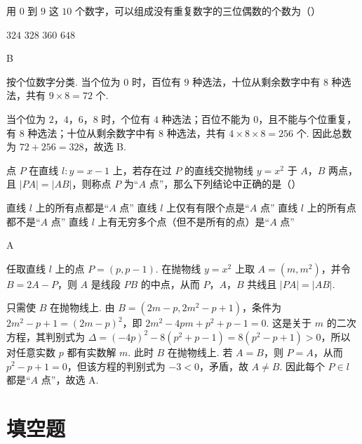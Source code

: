 \begin{problem}
用 \(0\) 到 \(9\) 这 \(10\) 个数字，可以组成没有重复数字的三位偶数的个数为（\quad）

\choices
    {\(324\)}
    {\(328\)}
    {\(360\)}
    {\(648\)}

\begin{answer}
B
\end{answer}

\begin{solution}
按个位数字分类. 当个位为 \(0\) 时，百位有 \(9\) 种选法，十位从剩余数字中有 \(8\) 种选法，共有 \(9\times8=72\) 个.

当个位为 \(2\)，\(4\)，\(6\)，\(8\) 时，个位有 \(4\) 种选法；百位不能为 \(0\)，且不能与个位重复，有 \(8\) 种选法；十位从剩余数字中有 \(8\) 种选法，共有 \(4\times8\times8=256\) 个. 因此总数为 \(72+256=328\)，故选 B.
\end{solution}
\end{problem}

\begin{problem}
点 \(P\) 在直线 \(l: y = x - 1\) 上，若存在过 \(P\) 的直线交抛物线 \(y = x^2\) 于 \(A\)，\(B\) 两点，且 \(|PA| = |AB|\)，则称点 \(P\) 为“\(A\) 点”，那么下列结论中正确的是（\quad）

\choices
    {直线 \(l\) 上的所有点都是“\(A\) 点”}
    {直线 \(l\) 上仅有有限个点是“\(A\) 点”}
    {直线 \(l\) 上的所有点都不是“\(A\) 点”}
    {直线 \(l\) 上有无穷多个点（但不是所有的点）是“\(A\) 点”}

\begin{answer}
A
\end{answer}

\begin{solution}
任取直线 \(l\) 上的点 \(P=(p,p-1)\). 在抛物线 \(y=x^2\) 上取 \(A=(m,m^2)\)，并令 \(B=2A-P\)，则 \(A\) 是线段 \(PB\) 的中点，从而 \(P\)，\(A\)，\(B\) 共线且 \(|PA|=|AB|\).

只需使 \(B\) 在抛物线上. 由 \(B=(2m-p,2m^2-p+1)\)，条件为 \(2m^2-p+1=(2m-p)^2\)，即 \(2m^2-4pm+p^2+p-1=0\). 这是关于 \(m\) 的二次方程，其判别式为 \(\Delta=(-4p)^2-8(p^2+p-1)=8(p^2-p+1)>0\)，所以对任意实数 \(p\) 都有实数解 \(m\). 此时 \(B\) 在抛物线上. 若 \(A=B\)，则 \(P=A\)，从而 \(p^2-p+1=0\)，但该方程的判别式为 \(-3<0\)，矛盾，故 \(A\ne B\). 因此每个 \(P\in l\) 都是“\(A\) 点”，故选 A.
\end{solution}
\end{problem}

\section{填空题}

